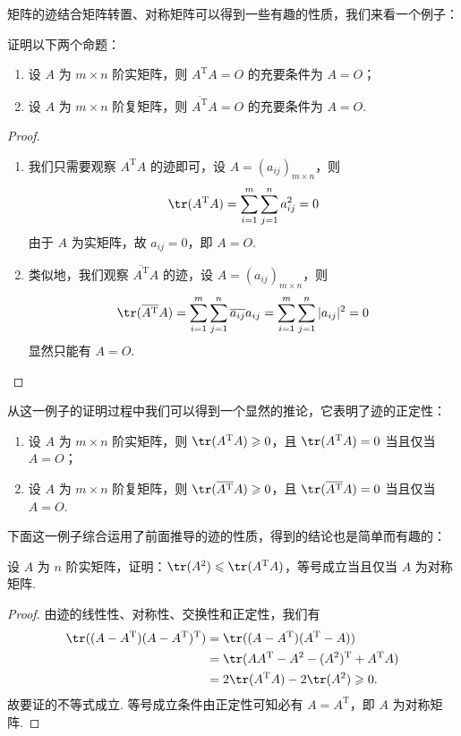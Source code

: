 矩阵的迹结合矩阵转置、对称矩阵可以得到一些有趣的性质，我们来看一个例子：
\begin{example}{}{}
    证明以下两个命题：
    \begin{enumerate}
        \item 设 $A$ 为 $m \times n$ 阶实矩阵，则 $A^\mathrm{T}A = O$ 的充要条件为 $A = O$；
        \item 设 $A$ 为 $m \times n$ 阶复矩阵，则 $\overline{A^\mathrm{T}}A = O$ 的充要条件为 $A = O$.
    \end{enumerate}
\end{example}
\begin{proof}
    \begin{enumerate}
        \item 我们只需要观察 $A^\mathrm{T}A$ 的迹即可，设 $A = (a_{ij})_{m \times n}$，则
        \[ \tr(A^\mathrm{T}A) = \sum\limits_{i=1}^m \sum\limits_{j=1}^n a_{ij}^2 = 0 \]
        由于 $A$ 为实矩阵，故 $a_{ij} = 0$，即 $A = O$.
        \item 类似地，我们观察 $\overline{A^\mathrm{T}}A$ 的迹，设 $A = (a_{ij})_{m \times n}$，则
        \[ \tr(\overline{A^\mathrm{T}}A) = \sum\limits_{i=1}^m \sum\limits_{j=1}^n \overline{a_{ij}}a_{ij} = \sum\limits_{i=1}^m \sum\limits_{j=1}^n |a_{ij}|^2 = 0 \]
        显然只能有 $A = O$.
    \end{enumerate}
\end{proof}

从这一例子的证明过程中我们可以得到一个显然的推论，它表明了迹的正定性：
\begin{corollary}{}{}
    \begin{enumerate}
        \item 设 $A$ 为 $m \times n$ 阶实矩阵，则 $\tr(A^\mathrm{T}A) \geqslant 0$，且 $\tr(A^\mathrm{T}A) = 0$ 当且仅当 $A = O$；
        \item 设 $A$ 为 $m \times n$ 阶复矩阵，则 $\tr(\overline{A^\mathrm{T}}A) \geqslant 0$，且 $\tr(\overline{A^\mathrm{T}}A) = 0$ 当且仅当 $A = O$.
    \end{enumerate}
\end{corollary}

下面这一例子综合运用了前面推导的迹的性质，得到的结论也是简单而有趣的：
\begin{example}{}{}
    设 $A$ 为 $n$ 阶实矩阵，证明：$\tr(A^2) \leqslant \tr(A^{\mathrm{T}}A)$，等号成立当且仅当 $A$ 为对称矩阵.
\end{example}
\begin{proof}
    由迹的线性性、对称性、交换性和正定性，我们有
    \begin{align*}
        \tr((A - A^\mathrm{T})(A - A^\mathrm{T})^\mathrm{T}) & = \tr((A - A^\mathrm{T})(A^\mathrm{T} - A)) \\
        & = \tr(AA^\mathrm{T} - A^2 - (A^2)^{\mathrm{T}} + A^{\mathrm{T}}A) \\
        & = 2\tr(A^{\mathrm{T}}A) - 2\tr(A^2) \geqslant 0.
    \end{align*}
    故要证的不等式成立. 等号成立条件由正定性可知必有 $A = A^\mathrm{T}$，即 $A$ 为对称矩阵.
\end{proof}


